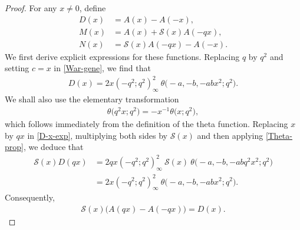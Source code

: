 \documentclass[12pt,reqno]{amsart}
\numberwithin{equation}{section}
\theoremstyle{plain}
\theoremstyle{definition}
\begin{document}
\begin{proof}
For any $x\neq0$, define
\begin{align}
D(x) &=A(x)-A(-x),\label{Def-D-x}\\
M(x) &=A(x)+\mathscr{S}(x)A(-qx),\label{Def-M-x}\\
N(x) &=\mathscr{S}(x)A(-qx)-A(-x).\label{Def-N-x}
\end{align}
We first derive explicit expressions for these functions. Replacing $q$ by $q^2$ and
setting $c=x$ in \eqref{War-gene}, we find that
\begin{align}
D(x)=2x(-q^2;q^2)_\infty^2\!\:\theta\big({-}a,-b,-abx^2;q^2\big).\label{D-x-exp}
\end{align}
We shall also use the elementary transformation
\begin{align}
\theta\big(q^2x;q^2\big)=-x^{-1}\theta\big(x;q^2\big),\label{Theta-prop}
\end{align}
which follows immediately from the definition of the theta function. Replacing $x$ by
$qx$ in \eqref{D-x-exp}, multiplying both sides by $\mathscr{S}(x)$ and then applying
\eqref{Theta-prop}, we deduce that
\begin{align*}
\mathscr{S}(x)D(qx) &=2qx(-q^2;q^2)_\infty^2\!\:\mathscr{S}(x)\!\:\theta
\big({-}a,-b,-abq^2x^2;q^2\big)
\nonumber\\
 &=2x(-q^2;q^2)_\infty^2\!\:\theta\big({-}a,-b,-abx^2;q^2\big).
\end{align*}
Consequently,
\begin{align}
\mathscr{S}(x)\big(A(qx)-A(-qx)\big)=D(x).\label{Aux-iden-1}
\end{align}


\end{proof}
\end{document}
